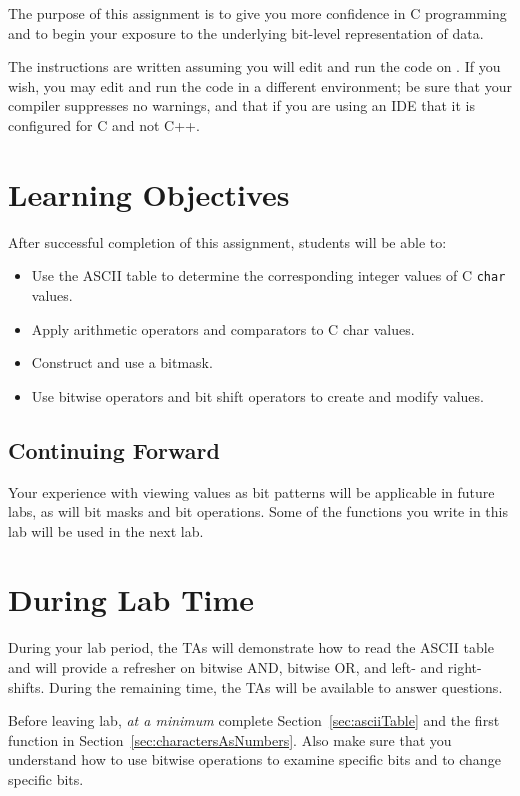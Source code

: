 The purpose of this assignment is to give you more confidence in C programming and to begin your exposure to the underlying bit-level representation of data.

The instructions are written assuming you will edit and run the code on \runtimeenvironment.
If you wish, you may edit and run the code in a different environment;
be sure that your compiler suppresses no warnings, and that if you are using an IDE that it is configured for C and not C++.

\section*{Learning Objectives}

After successful completion of this assignment, students will be able to:
\begin{itemize}
    \item Use the ASCII table to determine the corresponding integer values of C \lstinline{char} values.
    \item Apply arithmetic operators and comparators to C \lstinline{}{char} values.
    \item Construct and use a bitmask.
    \item Use bitwise operators and bit shift operators to create and modify values.
\end{itemize}

\subsection*{Continuing Forward}

Your experience with viewing values as bit patterns will be applicable in future labs, as will bit masks and bit operations.
Some of the functions you write in this lab will be used in the next lab.

\section*{During Lab Time}

During your lab period, the TAs will demonstrate how to read the ASCII table and will provide a refresher on bitwise AND, bitwise OR, and left- and right-shifts.
During the remaining time, the TAs will be available to answer questions.

Before leaving lab, \textit{at a minimum} complete Section~\ref{sec:asciiTable} and the first function in Section~\ref{sec:charactersAsNumbers}.
Also make sure that you understand how to use bitwise operations to examine specific bits and to change specific bits.

